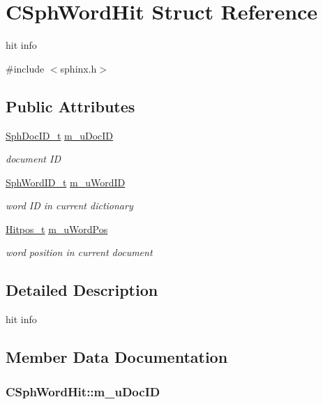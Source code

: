 \hypertarget{structCSphWordHit}{\section{C\-Sph\-Word\-Hit Struct Reference}
\label{structCSphWordHit}
}


hit info  




{\ttfamily \#include $<$sphinx.\-h$>$}

\subsection*{Public Attributes}
\begin{DoxyCompactItemize}
\item 
\hyperlink{sphinx_8h_a3176771631c12a9e4897272003e6b447}{Sph\-Doc\-I\-D\-\_\-t} \hyperlink{structCSphWordHit_a09950cc6c199f4c5e7d46bba57f3d581}{m\-\_\-u\-Doc\-I\-D}
\begin{DoxyCompactList}\small\item\em document I\-D \end{DoxyCompactList}\item 
\hyperlink{sphinx_8h_a80a94d5984fdf9214a98f3e5e65df963}{Sph\-Word\-I\-D\-\_\-t} \hyperlink{structCSphWordHit_ac2f9b72229ecdf0f9680b30576f4a853}{m\-\_\-u\-Word\-I\-D}
\begin{DoxyCompactList}\small\item\em word I\-D in current dictionary \end{DoxyCompactList}\item 
\hyperlink{sphinx_8h_af1385e83d53e0648b15eae6d8f101847}{Hitpos\-\_\-t} \hyperlink{structCSphWordHit_a6cf78f9299407e215f7776657dfeddb6}{m\-\_\-u\-Word\-Pos}
\begin{DoxyCompactList}\small\item\em word position in current document \end{DoxyCompactList}\end{DoxyCompactItemize}


\subsection{Detailed Description}
hit info 

\subsection{Member Data Documentation}
\hypertarget{structCSphWordHit_a09950cc6c199f4c5e7d46bba57f3d581}{
\subsubsection[{m\-\_\-u\-Doc\-I\-D}]{ C\-Sph\-Word\-Hit\-::m\-\_\-u\-Doc\-I\-D}}\label{structCSphWordHit_a09950cc6c199f4c5e7d46bba57f3d581}


